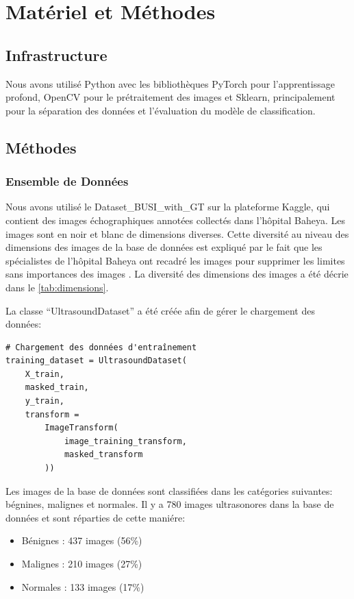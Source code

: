 \documentclass[a4paper,12pt]{article}
\begin{document}
\section{Matériel et Méthodes}

\subsection{Infrastructure}
Nous avons utilisé Python avec les bibliothèques PyTorch pour l'apprentissage profond, OpenCV pour le prétraitement des images et Sklearn, principalement pour la séparation des données et l'évaluation du modèle de classification.

\subsection{Méthodes}
\subsubsection{Ensemble de Données}
Nous avons utilisé le Dataset\_BUSI\_with\_GT \cite{al2020dataset} sur la plateforme Kaggle, qui contient des images échographiques annotées collectés dans l'hôpital Baheya. Les images sont en noir et blanc de dimensions diverses. Cette diversité au niveau des dimensions des images de la base de données est expliqué par le fait que les spécialistes de l'hôpital Baheya ont recadré les images pour supprimer les limites sans importances des images \cite{al2020dataset}. La diversité des dimensions des images a été décrie dans le \autoref{tab:dimensions}.

La classe \enquote{UltrasoundDataset} a été créée afin de gérer le chargement des données:
\begin{verbatim}
# Chargement des données d'entraînement
training_dataset = UltrasoundDataset(
    X_train,
    masked_train,
    y_train,
    transform =
        ImageTransform(
            image_training_transform,
            masked_transform
        ))
\end{verbatim}

Les images de la base de données sont classifiées dans les catégories suivantes: bégnines, malignes et normales. Il y a 780 images ultrasonores dans la base de données et sont réparties de cette maniére:
\begin{itemize}
    \item Bénignes : 437 images (56\%)
    \item Malignes : 210 images (27\%)
    \item Normales : 133 images (17\%)
\end{itemize}
\end{document}
